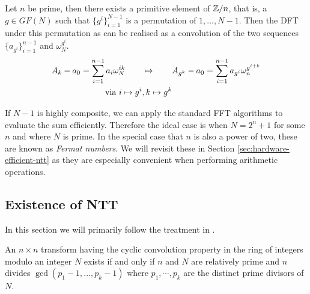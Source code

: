 \begin{definition}\label{thm:rader-transform}
    Let $n$ be prime, then there exists a primitive element of ${\mathbb Z}/n$, that is, a $g \in GF(N)$ such that $\{g^i\}_{i=1}^{N-1}$ is a permutation of $1, \ldots, N-1$. Then the DFT under this permutation as can be realised as a convolution of the two sequences $\{a_{g^i}\}_{i=1}^{n-1}$ and $\omega_N^{g^i}$.
    \begin{align*}
        A_k - a_0 = \sum^{n-1}_{i=1} a_i \omega_N^{ik} \qquad &\mapsto \qquad A_{g^k} - a_0 = \sum^{n-1}_{i=1} a_{g^i}\omega_n^{g^{i+k}}\\
        \textrm{ via } i \mapsto g^i&, k \mapsto g^k
    \end{align*}
\end{definition}

If $N - 1$ is highly composite, we can apply the standard FFT algorithms to evaluate the sum efficiently. Therefore the ideal case is when $N = 2^n + 1$ for some $n$ and where $N$ is prime. In the special case that $n$ is also a power of two, these are known as \emph{Fermat numbers}. We will revisit these in Section \ref{sec:hardware-efficient-ntt} as they are especially convenient when performing arithmetic operations.

\subsection{Existence of NTT}%
\label{sub:Existence of NTT}

In this section we will primarily follow the treatment in \cite{intro-to-fmt}.

\begin{theorem}\label{thm:fmt-transform-length}
    An $n \times n$ transform having the cyclic convolution property in the ring of integers modulo an integer $N$ exists if and only if $n$ and $N$ are relatively prime and $n$ divides $\gcd(p_1 - 1, \ldots, p_k - 1)$ where $p_1, \cdots, p_k$ are the distinct prime divisors of $N$.
\end{theorem}

